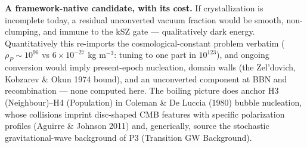 \documentclass[
]{article}
\begin{document}
\textbf{A framework-native candidate, with its cost.} If crystallization
is incomplete today, a residual unconverted vacuum fraction would be
smooth, non-clumping, and immune to the kSZ gate --- qualitatively dark
energy. Quantitatively this re-imports the cosmological-constant problem
verbatim (\(\rho_P \sim 10^{96}\) vs \(6\times10^{-27}\) kg m\(^{-3}\):
tuning to one part in \(10^{123}\)), and ongoing conversion would imply
present-epoch nucleation, domain walls (the Zel'dovich, Kobzarev \& Okun
1974 bound), and an unconverted component at BBN and recombination ---
none computed here. The boiling picture does anchor H3 (Neighbour)--H4
(Population) in Coleman \& De Luccia (1980) bubble nucleation, whose
collisions imprint disc-shaped CMB features with specific polarization
profiles (Aguirre \& Johnson 2011) and, generically, source the
stochastic gravitational-wave background of P3 (Transition GW
Background).
\end{document}
